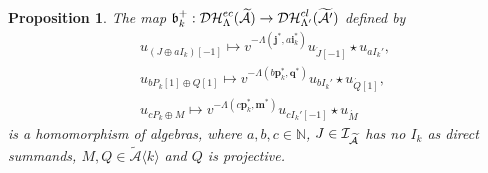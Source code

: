 \documentclass[reqno,12pt]{amsart}
\numberwithin{equation}{section}
\theoremstyle{plain} %
\newtheorem{proposition}[theorem]{\bf Proposition}
\theoremstyle{definition} %
\begin{document}
\begin{proposition}
The map $\mathfrak{b}_k^+:\mathcal{DH}_{\Lambda}^{ec}(\widetilde{\mathcal{A}})\to \mathcal{DH}_{\Lambda'}^{cl}(\widetilde{\mathcal{A}'})$ defined by
\begin{align*}
&u_{(J\oplus aI_k)[-1]}\mapsto v^{-\Lambda(\mathbf{j}^\ast,a\mathbf{i}_k^\ast)}u_{\acute{J}[-1]}\star u_{aI_k'},\\
&u_{bP_k[1]\oplus Q[1]}\mapsto v^{-\Lambda(b\mathbf{p}_k^\ast, \mathbf{q}^\ast)}u_{bI_k'}\star u_{\acute{Q}[1]},\\
&u_{cP_k\oplus M}\mapsto v^{-\Lambda(c{\mathbf{p}_k^\ast},\mathbf{m}^\ast)}u_{cI_k'[-1]}\star u_{\acute{M}}
\end{align*}
is a homomorphism of algebras,
where $a,b,c\in \mathbb{N}$, $J\in \mathcal{I}_{\widetilde{\mathcal{A}}}$ has no $I_k$ as direct summands,
$M, Q\in \widetilde{\mathcal{A}}\langle k\rangle$ and $Q$ is projective.
\end{proposition}
\end{document}
